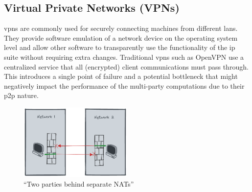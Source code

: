\hypertarget{virtual-private-networks-vpns}{%
\subsection{Virtual Private Networks
(VPNs)}\label{virtual-private-networks-vpns}}

\glspl{vpn} are commonly used for securely connecting machines from
different \glspl{lan}. They provide software emulation of a network
device on the operating system level and allow other software to
transparently use the functionality of the \gls{ip} suite without
requiring extra changes. Traditional \glspl{vpn} such as
OpenVPN\autocite{openVPNDocs} use a centralized service that all
(encrypted) client communications must pass through. This introduces a
single point of failure and a potential bottleneck that might negatively
impact the performance of the multi-party computations due to their
\gls{p2p} nature.

\begin{figure}
\centering
\includegraphics[width=0.5\textwidth,height=0.25\textheight]{prep/../figures/nat-intro.png}
\caption{``Two parties behind separate NATs''\label{nat-intro}}
\end{figure}


